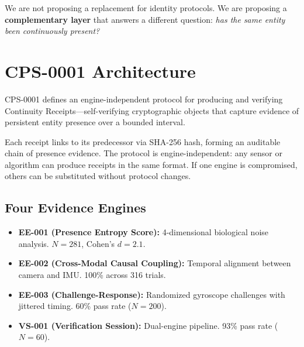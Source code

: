 \documentclass[10pt]{article}
\begin{document}
We are not proposing a replacement for identity protocols. We are proposing a \textbf{complementary layer} that answers a different question: \textit{has the same entity been continuously present?}

\section*{CPS-0001 Architecture}

CPS-0001 defines an engine-independent protocol for producing and verifying Continuity Receipts---self-verifying cryptographic objects that capture evidence of persistent entity presence over a bounded interval.

\begin{center}
\end{center}

Each receipt links to its predecessor via SHA-256 hash, forming an auditable chain of presence evidence. The protocol is engine-independent: any sensor or algorithm can produce receipts in the same format. If one engine is compromised, others can be substituted without protocol changes.

\subsection*{Four Evidence Engines}

\begin{itemize}
  \item \textbf{EE-001 (Presence Entropy Score):} 4-dimensional biological noise analysis. $N=281$, Cohen's $d = 2.1$.
  \item \textbf{EE-002 (Cross-Modal Causal Coupling):} Temporal alignment between camera and IMU. 100\% across 316 trials.
  \item \textbf{EE-003 (Challenge-Response):} Randomized gyroscope challenges with jittered timing. 60\% pass rate ($N=200$).
  \item \textbf{VS-001 (Verification Session):} Dual-engine pipeline. 93\% pass rate ($N=60$).
\end{itemize}
\end{document}
